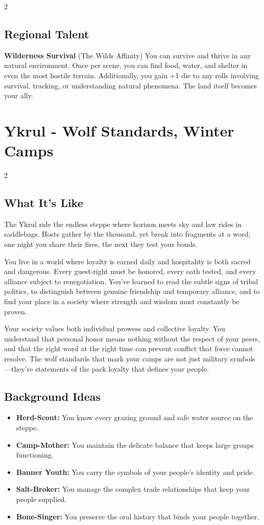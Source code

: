 \documentclass[11pt]{article}
\newcommand{\region}[1]{\section*{#1}}
\newcommand{\subregion}[1]{\subsection*{#1}}
\begin{document}
\begin{multicols}{2}
\subregion{Regional Talent}

\textbf{Wilderness Survival} (The Wilds Affinity)
You can survive and thrive in any natural environment. Once per scene, you can find food, water, and shelter in even the most hostile terrain. Additionally, you gain +1 die to any rolls involving survival, tracking, or understanding natural phenomena. The land itself becomes your ally.

\end{multicols}

\region{Ykrul - Wolf Standards, Winter Camps}

\begin{multicols}{2}
\subregion{What It's Like}

The Ykrul ride the endless steppe where horizon meets sky and law rides in saddlebags. Hosts gather by the thousand, yet break into fragments at a word; one night you share their fires, the next they test your bonds.

You live in a world where loyalty is earned daily and hospitality is both sacred and dangerous. Every guest-right must be honored, every oath tested, and every alliance subject to renegotiation. You've learned to read the subtle signs of tribal politics, to distinguish between genuine friendship and temporary alliance, and to find your place in a society where strength and wisdom must constantly be proven.

Your society values both individual prowess and collective loyalty. You understand that personal honor means nothing without the respect of your peers, and that the right word at the right time can prevent conflict that force cannot resolve. The wolf standards that mark your camps are not just military symbols---they're statements of the pack loyalty that defines your people.

\columnbreak

\subregion{Background Ideas}

\begin{itemize}[leftmargin=*]
    \item \textbf{Herd-Scout:} You know every grazing ground and safe water source on the steppe.
    \item \textbf{Camp-Mother:} You maintain the delicate balance that keeps large groups functioning.
    \item \textbf{Banner Youth:} You carry the symbols of your people's identity and pride.
    \item \textbf{Salt-Broker:} You manage the complex trade relationships that keep your people supplied.
    \item \textbf{Bone-Singer:} You preserve the oral history that binds your people together.
\end{itemize}


\end{multicols}
\end{document}

